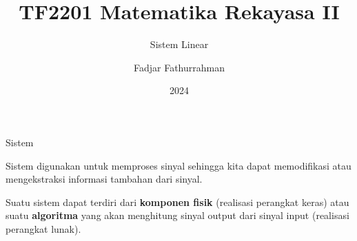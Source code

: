 

\title{TF2201 Matematika Rekayasa II}
\subtitle{Sistem Linear}
\author{Fadjar Fathurrahman}
\date{2024}



\frame{\titlepage}

\begin{frame}{Sistem}

Sistem digunakan untuk memproses sinyal sehingga kita dapat memodifikasi atau
mengekstraksi informasi tambahan dari sinyal.

Suatu sistem dapat terdiri dari \textbf{komponen fisik} (realisasi
perangkat keras)
atau suatu \textbf{algoritma} yang akan menghitung sinyal output dari
sinyal input (realisasi perangkat lunak).

\end{frame}


